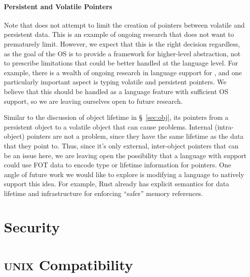 {        \paragraph{Persistent and Volatile Pointers}

        Note that \Twizzler does not attempt to limit the creation of pointers between volatile and
        persistent data. This is an example of ongoing \NVM research that \Twizzler does not want to
        prematurely limit. However, we expect that this is the right decision regardless, as the goal of the
        OS is to provide a framework for higher-level abstraction, not to prescribe limitations that could
        be better handled at the language level. For example, there is a wealth of ongoing research in
        language support for \NVM {}, and one particularly important aspect is typing volatile and
        persistent pointers. We believe that this should be handled as a language feature with sufficient OS
        support, so we are leaving ourselves open to future research.

        Similar to the discussion of object lifetime in \S~\ref{sec:obj}, its pointers from a persistent
        object to a volatile object that can cause problems. Internal (intra-object) pointers are not a
        problem, since they have the same lifetime as the data that they point to. Thus, since it's only
        external, inter-object pointers that can be an issue here, we are leaving open the possibility that
        a language with \Twizzler support could use FOT data to encode type or lifetime information for
        pointers. One angle of future work we would like to explore is modifying a language to natively
        support this idea. For example, Rust already has explicit semantics for data lifetime and
        infrastructure for enforcing ``safer'' memory references.
    \fi
}
\section{Security}

\section{\textsc{unix} Compatibility}

